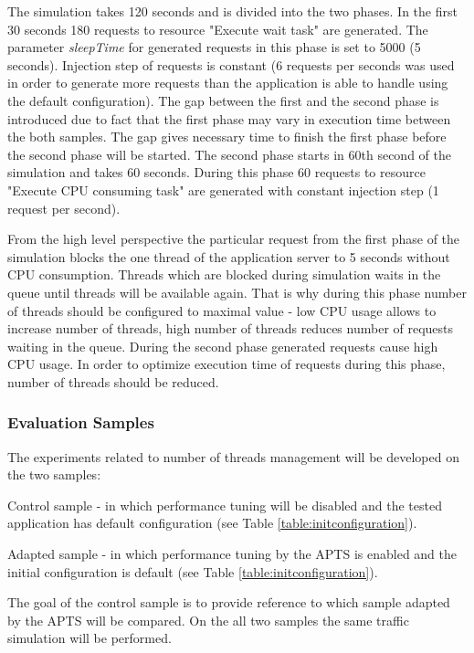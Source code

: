 \documentclass[12pt,a4paper]{article}
\let\tempone\itemize
\let\temptwo\enditemize
\renewenvironment{itemize}{\tempone\addtolength{\itemsep}{-0.4\baselineskip}}{\temptwo}
\begin{document}
The simulation takes 120 seconds and is divided into the two phases. In the first 30 seconds 180 requests to resource "Execute wait task" are generated. The parameter \textit{sleepTime} for generated requests in this phase is set to 5000 (5 seconds). Injection step of requests is constant (6 requests per seconds was used in order to generate more requests than the application is able to handle using the default configuration). The gap between the first and the second phase is introduced due to fact that the first phase may vary in execution time between the both samples. The gap gives necessary time to finish the first phase before the second phase will be started. The second phase starts in 60th second of the simulation and takes 60 seconds. During this phase 60 requests to resource "Execute CPU consuming task" are generated with constant injection step (1 request per second). 

From the high level perspective the particular request from the first phase of the simulation blocks the one thread of the application server to 5 seconds without CPU consumption. Threads which are blocked during simulation waits in the queue until threads will be available again. That is why during this phase number of threads should be configured to maximal value - low CPU usage allows to increase number of threads, high number of threads reduces number of requests waiting in the queue. During the second phase generated requests cause high CPU usage. In order to optimize execution time of requests during this phase, number of threads should be reduced.    

 
\subsubsection{Evaluation Samples}

The experiments related to number of threads management will be developed on the two samples:
\begin{itemize}
\item Control sample - in which performance tuning will be disabled and the tested application has default  configuration (see Table \ref{table:initconfiguration}).  
\item Adapted sample - in which performance tuning by the APTS is enabled and the initial configuration is default (see Table \ref{table:initconfiguration}).
\end{itemize}

The goal of the control sample is to provide reference to which sample adapted by the APTS will be compared. On the all two samples the same traffic simulation will be performed.
 
\end{document}

